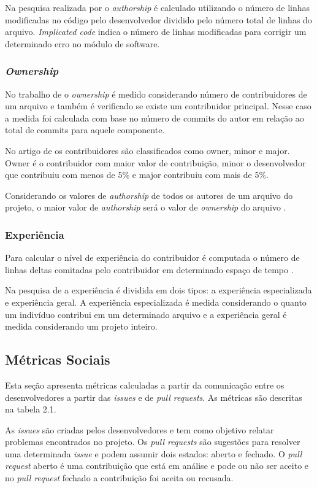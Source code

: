Na pesquisa realizada por  o \textit{authorship} é calculado utilizando o número de linhas modificadas no código pelo desenvolvedor dividido pelo número total de linhas do arquivo. \textit{Implicated code} indica o número de linhas modificadas para corrigir um determinado erro no módulo de software.

\subsubsection{\textit{Ownership}}
No trabalho de  o \textit{ownership} é medido considerando número de contribuidores de um arquivo e também é verificado se existe um contribuidor principal. Nesse caso a medida foi calculada com base no número de commits do autor em relação ao total de commits para aquele componente.

No artigo de  os contribuidores são classificados como owner, minor e major. Owner é o contribuidor com maior valor de contribuição, minor o desenvolvedor que contribuiu com menos de 5\% e major contribuiu com mais de 5\%.

Considerando os valores de \textit{authorship} de todos os autores de um arquivo do projeto, o maior valor de \textit{authorship} será o valor de \textit{ownership} do arquivo \cite{Foucault2015}. 

\subsubsection{Experiência}
Para calcular o nível de experiência do contribuidor é computada o número de linhas deltas comitadas pelo contribuidor em determinado espaço de tempo  \cite{Rahman2011}.

Na pesquisa de  a experiência é dividida em dois tipos: a experiência especializada e experiência geral. A experiência especializada é medida considerando o quanto um indivíduo contribui em um determinado arquivo e a experiência geral é medida considerando um projeto inteiro.

\subsection{Métricas Sociais}
Esta seção apresenta métricas calculadas a partir da comunicação entre os desenvolvedores a partir das \textit{issues} e de \textit{pull requests}. As métricas são descritas na tabela 2.1.

As \textit{issues} são criadas pelos desenvolvedores e tem como objetivo relatar problemas encontrados no projeto. Os \textit{pull requests} são sugestões para resolver uma determinada \textit{issue} e podem assumir dois estados: aberto e fechado. O \textit{pull request} aberto é uma contribuição que está em análise e pode ou não ser aceito e no \textit{pull request} fechado a contribuição foi aceita ou recusada.

